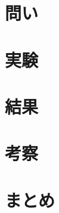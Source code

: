\documentclass[titlepage]{jsarticle}
\begin{document}






\section{問い}










\section{実験}










\section{結果}










\section{考察}










\section{まとめ}
\end{document}
